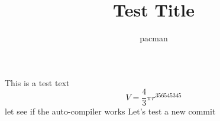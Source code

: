 \documentclass[a4paper]{report}
\title{Test Title}
\author{pacman}
\begin{document}
  This is a test text
  $$V=\frac{4}{3}\pi r^356545345$$
  let see if the auto-compiler works
  Let's test a new commit
\end{document}
